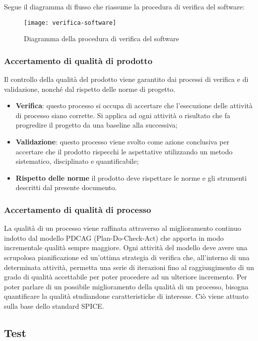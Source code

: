 \documentclass[../NormediProgetto.tex]{subfiles}
\begin{document}
Segue il diagramma di flusso che riassume la procedura di verifica del software:

\begin{figure}[H]
	\texttt{[image: verifica-software]}
	\centering
	\caption{Diagramma della procedura di verifica del software}
\end{figure}

\subsubsection{Accertamento di qualità di prodotto}
Il controllo della qualità del prodotto viene garantito dai processi di verifica e di validazione, nonché dal rispetto delle norme di progetto.
\begin{itemize}
	\item \textbf{Verifica}: questo processo si occupa di accertare che l’esecuzione delle attività
	di processo siano corrette. Si applica ad ogni attività o risultato che fa progredire il progetto da una baseline alla successiva;
	\item \textbf{Validazione}: questo processo viene svolto come azione conclusiva per accertare
	che il prodotto rispecchi le aspettative utilizzando un metodo sistematico, disciplinato
	e quantificabile;
	\item \textbf{Rispetto delle norme} il prodotto deve rispettare le norme e gli strumenti descritti dal
	presente documento.
\end{itemize}

\subsubsection{Accertamento di qualità di processo}
La qualità di un processo viene raffinata attraverso al miglioramento continuo indotto dal modello PDCAG (Plan-Do-Check-Act) che apporta in modo incrementale qualità sempre maggiore. Ogni attività del modello deve avere una scrupolosa pianificazione ed un’ottima
strategia di verifica che, all’interno di una determinata attività, permetta una serie di iterazioni fino al raggiungimento di un grado di qualità
accettabile per poter procedere ad un ulteriore incremento. Per poter parlare di un possibile miglioramento della qualità di un processo, bisogna
quantificare la qualità studiandone caratteristiche
di interesse. Ciò viene attuato sulla base dello standard SPICE.

\subsection{Test}
\end{document}
